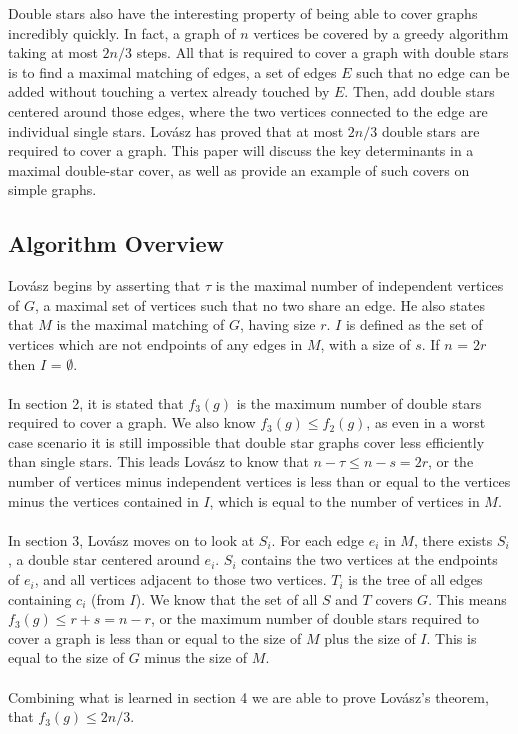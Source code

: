 \documentclass{article}
\begin{document}
	Double stars also have the interesting property of being able to cover graphs incredibly quickly. In fact, a graph of $n$ vertices be covered by a greedy algorithm taking at most $2n/3$ steps. All that is required to cover a graph with double stars is to find a maximal matching of edges, a set of edges $E$ such that no edge can be added without touching a vertex already touched by $E$. Then, add double stars centered around those edges, where the two vertices connected to the edge are individual single stars. Lov\'asz has proved that at most $2n/3$ double stars are required to cover a graph. This paper will discuss the key determinants in a maximal double-star cover, as well as provide an example of such covers on simple graphs.
	\subsection{Algorithm Overview}
	
	Lov\'asz begins by asserting that $\tau$ is the maximal number of independent vertices of $G$, a maximal set of vertices such that no two share an edge. He also states that $M$ is the maximal matching of $G$, having size $r$. $I$ is defined as the set of vertices which are not endpoints of any edges in $M$, with a size of $s$. If $n$ = $2r$ then $I$ = $\emptyset$.
	\\\\
	In section 2, it is stated that $f_{3}(g)$ is the maximum number of double stars required to cover a graph. We also know $f_{3}(g) \leq f_{2}(g)$, as even in a worst case scenario it is still impossible that double star graphs cover less efficiently than single stars. This leads Lov\'asz to know that $n-\tau \leq n-s = 2r$, or the number of vertices minus independent vertices is less than or equal to the vertices minus the vertices contained in $I$, which is equal to the number of vertices in $M$.
	\\\\
	In section 3, Lov\'asz moves on to look at $S_{i}$. For each edge $e_{i}$ in $M$, there exists $S_{i}$, a double star centered around $e_{i}$. $S_{i}$ contains the two vertices at the endpoints of $e_{i}$, and all vertices adjacent to those two vertices. $T_{i}$ is the tree of all edges containing $c_{i}$ (from $I$). We know that the set of all $S$ and $T$ covers $G$. This means $f_{3}(g) \leq r + s = n - r$, or the maximum number of double stars required to cover a graph is less than or equal to the size of $M$ plus the size of $I$. This is equal to the size of $G$ minus the size of $M$.
	\\\\
	Combining what is learned in section 4 we are able to prove Lov\'asz's theorem, that $f_{3}(g) \leq 2n/3$.
	
\end{document}
